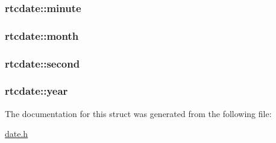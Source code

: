 \subsubsection[{\texorpdfstring{minute}{minute}}]{ rtcdate\+::minute}\hypertarget{structrtcdate_a5984e264f332d7634912db2716472aa7}{}\label{structrtcdate_a5984e264f332d7634912db2716472aa7}
\subsubsection[{\texorpdfstring{month}{month}}]{ rtcdate\+::month}\hypertarget{structrtcdate_a3c509170b31d76f828681c2df54bf0b1}{}\label{structrtcdate_a3c509170b31d76f828681c2df54bf0b1}
\subsubsection[{\texorpdfstring{second}{second}}]{ rtcdate\+::second}\hypertarget{structrtcdate_affc39128483c500d77d1a012fe045664}{}\label{structrtcdate_affc39128483c500d77d1a012fe045664}
\subsubsection[{\texorpdfstring{year}{year}}]{ rtcdate\+::year}\hypertarget{structrtcdate_a143aaaa0a5fcaae876c0af5f135ea5c8}{}\label{structrtcdate_a143aaaa0a5fcaae876c0af5f135ea5c8}


The documentation for this struct was generated from the following file\+:\begin{DoxyCompactItemize}
\item 
\hyperlink{date_8h}{date.\+h}\end{DoxyCompactItemize}
